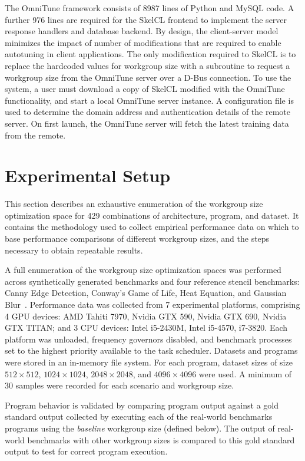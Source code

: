 \documentclass[nonatbib,preprint,nocopyrightspace,9pt]{sigplanconf}
\begin{document}
  The OmniTune framework consists of 8987 lines of Python and MySQL code. A
  further 976 lines are required for the SkelCL frontend to implement the server
  response handlers and database backend. By design, the client-server model
  minimizes the impact of number of modifications that are required to enable
  autotuning in client applications. The only modification required to SkelCL is
  to replace the hardcoded values for workgroup size with a subroutine to request
  a workgroup size from the OmniTune server over a D-Bus connection. To use the
  system, a user must download a copy of SkelCL modified with the OmniTune
  functionality, and start a local OmniTune server instance. A configuration file
  is used to determine the domain address and authentication details of the remote
  server. On first launch, the OmniTune server will fetch the latest training data
  from the remote.


  \section{Experimental Setup}

  This section describes an exhaustive enumeration of the workgroup size
  optimization space for 429 combinations of architecture, program, and dataset.
  It contains the methodology used to collect empirical performance data on which
  to base performance comparisons of different workgroup sizes, and the steps
  necessary to obtain repeatable results.

  A full enumeration of the workgroup size optimization spaces was performed
  across synthetically generated benchmarks and four reference stencil benchmarks:
  Canny Edge Detection, Conway's Game of Life, Heat Equation, and Gaussian
  Blur~\cite{Steuwer2011}. Performance data was collected from 7 experimental
  platforms, comprising 4 GPU devices: AMD Tahiti 7970, Nvidia GTX 590, Nvidia GTX
  690, Nvidia GTX TITAN; and 3 CPU devices: Intel i5-2430M, Intel i5-4570,
  i7-3820. Each platform was unloaded, frequency governors disabled, and benchmark
  processes set to the highest priority available to the task scheduler. Datasets
  and programs were stored in an in-memory file system. For each program, dataset
  sizes of size $512\times512$, $1024\times1024$, $2048\times2048$, and
  $4096\times4096$ were used. A minimum of 30 samples were recorded for each
  scenario and workgroup size.

  Program behavior is validated by comparing program output against a gold
  standard output collected by executing each of the real-world benchmarks
  programs using the \emph{baseline} workgroup size (defined below). The output of
  real-world benchmarks with other workgroup sizes is compared to this gold
  standard output to test for correct program execution.
\end{document}
